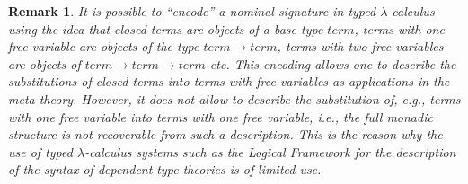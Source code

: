 \documentclass[11pt]{article}
\newtheorem{remark}[proposition]{Remark}
\newcommand{\sr}{\rightarrow}
\begin{document}
%
\begin{remark}\rm
It is possible to ``encode'' a nominal signature in typed $\lambda$-calculus using the idea that closed terms are objects of a base type $term$, terms with one free variable are objects of the type $term\sr term$, terms with two free variables are objects of $term\sr term\sr term$ etc. This encoding allows one to describe the substitutions of closed terms into terms with free variables as applications in the meta-theory.  However, it does not allow to describe the substitution of, e.g., terms with one free variable into terms with one free variable, i.e., the full monadic structure is not recoverable from such a description. This is the reason why the use of typed $\lambda$-calculus systems such as the Logical Framework for the description of the syntax of dependent type theories is of limited use.
\end{remark}
%
\end{document}
